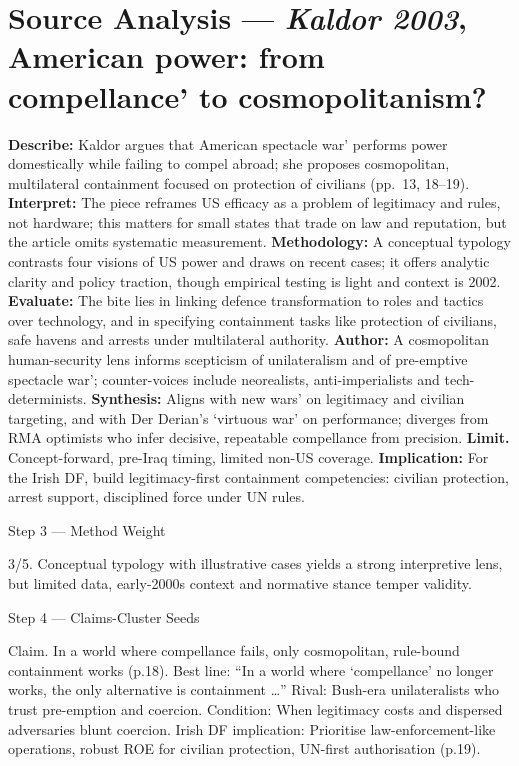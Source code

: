 \section*{Source Analysis — \textit{Kaldor 2003}, American power: from compellance' to cosmopolitanism?} \textbf{Describe:} Kaldor argues that American spectacle war' performs power domestically while failing to compel abroad; she proposes cosmopolitan, multilateral containment focused on protection of civilians (pp.~13, 18–19).
\textbf{Interpret:} The piece reframes US efficacy as a problem of legitimacy and rules, not hardware; this matters for small states that trade on law and reputation, but the article omits systematic measurement.
\textbf{Methodology:} A conceptual typology contrasts four visions of US power and draws on recent cases; it offers analytic clarity and policy traction, though empirical testing is light and context is 2002.
\textbf{Evaluate:} The bite lies in linking defence transformation to roles and tactics over technology, and in specifying containment tasks like protection of civilians, safe havens and arrests under multilateral authority.
\textbf{Author:} A cosmopolitan human-security lens informs scepticism of unilateralism and of pre-emptive spectacle war'; counter-voices include neorealists, anti-imperialists and tech-determinists. \textbf{Synthesis:} Aligns with new wars' on legitimacy and civilian targeting, and with Der Derian’s `virtuous war' on performance; diverges from RMA optimists who infer decisive, repeatable compellance from precision.
\textbf{Limit.} Concept-forward, pre-Iraq timing, limited non-US coverage.
\textbf{Implication:} For the Irish DF, build legitimacy-first containment competencies: civilian protection, arrest support, disciplined force under UN rules.

Step 3 — Method Weight

3/5. Conceptual typology with illustrative cases yields a strong interpretive lens, but limited data, early-2000s context and normative stance temper validity.

Step 4 — Claims-Cluster Seeds

Claim. In a world where compellance fails, only cosmopolitan, rule-bound containment works (p.18). Best line: “In a world where ‘compellance’ no longer works, the only alternative is containment …” Rival: Bush-era unilateralists who trust pre-emption and coercion. Condition: When legitimacy costs and dispersed adversaries blunt coercion. Irish DF implication: Prioritise law-enforcement-like operations, robust ROE for civilian protection, UN-first authorisation (p.19).

